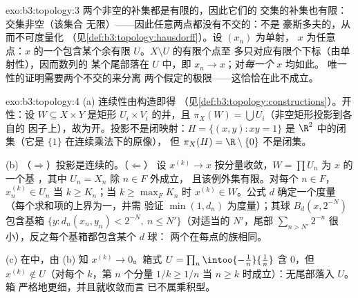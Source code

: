 \begin{solution}{exo:b3:topology:3}
两个非空的补集都是有限的，因此它们的
交集的补集也有限：交集非空（该集合
无限）——因此任意两点都没有不交的：不是
豪斯多夫的，从而不可度量化
（见\cref{def:b3:topology:hausdorff}）。设 $(x_n)$ 为单射，
$x$ 为任意点：$x$ 的一个包含某个余有限
$U$。$X\setminus U$ 的有限个点至
多只对应有限个下标（由单射性），因而数列的
某个尾部落在 $U$ 中，即 $x_n \to x$；对\emph{每一个} $x$ 均如此。
唯一性的证明需要两个不交的来分离
两个假定的极限——这恰恰在此不成立。
\end{solution}

\begin{solution}{exo:b3:topology:4}
(a) 连续性由构造即得
（见\cref{def:b3:topology:constructions}）。开性：设 $W
\subseteq X \times Y$ 是矩形 $U_i\times V_i$ 的并，且
$\pi_X(W) = \bigcup U_i$（非空矩形投影到各自的
因子上），故为开。投影不是闭映射：$H = \{(x,y) : xy = 1\}$ 是
$\R^2$ 中的闭集（它是 $\{1\}$ 在连续乘法下的原像），
但 $\pi_X(H) = \R\setminus\{0\}$ 不是闭集。

(b) （$\Rightarrow$）投影是连续的。（$\Leftarrow$）
设 $x^{(k)} \to x$ 按分量收敛，$W = \prod U_n$ 为 $x$ 的一个基
，其中 $U_n = X_n$ 除 $n \in F$ 外成立，
且该例外集有限。对每个 $n \in F$，$x_n^{(k)} \in U_n$ 当 $k \geq
K_n$；当 $k \geq \max_F K_n$ 时 $x^{(k)} \in W$。公式 $d$
确定一个度量（每个求和项的上界为一，并需
验证 $\min(1, d_n)$ 为度量）；其球 $B_d(x,
2^{-N})$ 包含基箱 $\{y : d_n(x_n,y_n) < 2^{-N},\
n \leq N'\}$（对适当的 $N'$，尾部 $\sum_{n > N'} 2^{-n}$
很小），反之每个基箱都包含某个 $d$ 球：
两个在每点的族相同。

(c) 在中，由 (b) 知 $x^{(k)} \to 0$。箱式
\omterm{def:b3:topology:topology}{开集} $U = \prod_n \intoo{-\tfrac1n}{\tfrac1n}$ 含 $0$，但
$x^{(k)} \notin U$（对每个 $k$，第 $n$ 个分量 $1/k
\geq 1/n$ 当 $n \geq k$ 时成立）：无尾部落入 $U$。箱
严格地更细，并且就收敛而言
已不属乘积型。
\end{solution}

